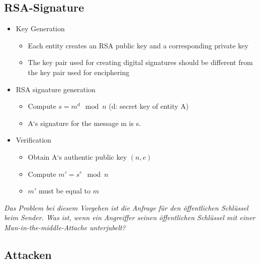 \clearpage
\hypertarget{rsa-signature}{%
\subsection{RSA-Signature}\label{rsa-signature}}

\begin{itemize}
\tightlist
\item
  Key Generation

  \begin{itemize}
  \tightlist
  \item
    Each entity creates an RSA public key and a corresponding private
    key
  \item
    The key pair used for creating digital signatures should be
    different from the key pair used for enciphering
  \end{itemize}
\item
  RSA signature generation

  \begin{itemize}
  \tightlist
  \item
    Compute $s = m^d \mod n$ (d: secret key of entity A)
  \item
    A`s signature for the message m is s.
  \end{itemize}
\item
  Verification

  \begin{itemize}
  \tightlist
  \item
    Obtain A`s authentic public key $(n, e)$
  \item
    Compute $m' = s^e \mod n$
  \item
    $m'$ must be equal to $m$
  \end{itemize}
\end{itemize}

\emph{Das Problem bei diesem Vorgehen ist die Anfrage für den
öffentlichen Schlüssel beim Sender. Was ist, wenn ein Angreiffer seinen
öffentlichen Schlüssel mit einer Man-in-the-middle-Attache unterjubelt?}

\hypertarget{attacken}{%
\subsection{Attacken}\label{attacken}}


